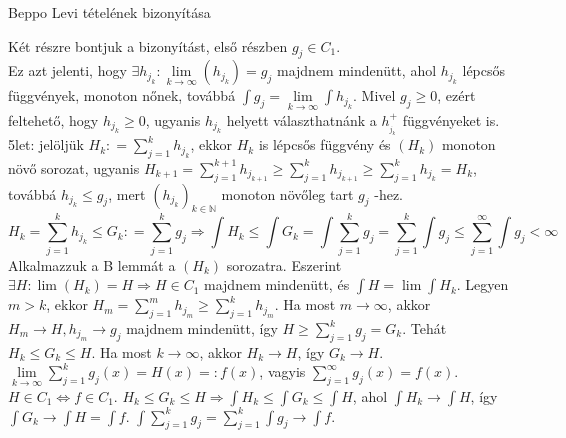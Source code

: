 \documentclass[12pt,a4paper]{scrartcl}
\newenvironment{bizonyitas}{}{}
\begin{document}
\begin{bizonyitas}

Beppo Levi tételének bizonyítása

Két részre bontjuk a bizonyítást, első részben \(g_{j} \in C_{1}\).\\
Ez azt jelenti, hogy
\(\exists h_{j_{k}}:\lim\limits_{k\rightarrow\infty}\left( h_{j_{k}} \right) = g_{j}\)
majdnem mindenütt, ahol \(h_{j_{k}}\) lépcsős függvények, monoton nőnek,
továbbá
\({\int{g_{j} =}}\lim\limits_{k\rightarrow\infty}{\int h_{j_{k}}}\).
Mivel \(g_{j} \geq 0\), ezért feltehető, hogy \(h_{j_{k}} \geq 0\),
ugyanis \(h_{j_{k}}\) helyett választhatnánk a \(h_{{}_{j_{k}}}^{+}\)
függvényeket is. 5let: jelöljük
\(H_{k}: = {\sum\limits_{j = 1}^{k}h_{j_{k}}}\), ekkor \(H_{k}\) is
lépcsős függvény és \(\left( H_{k} \right)\) monoton növő sorozat,
ugyanis
\(H_{k + 1} = {\sum\limits_{j = 1}^{k + 1}h_{j_{k + 1}}} \geq {\sum\limits_{j = 1}^{k}h_{j_{k + 1}}} \geq {\sum\limits_{j = 1}^{k}h_{j_{k}}} = H_{k}\),
továbbá \(h_{j_{k}} \leq g_{j}\), mert
\(\left( h_{j_{k}} \right)_{k \in {\mathbb{N}}}\) monoton növőleg tart
\(g_{j}\) -hez.
\[{H_k} = \sum\limits_{j = 1}^k {{h_{{j_k}}}}  \leqslant {G_k}: = \sum\limits_{j = 1}^k {{g_j}}  \Rightarrow \int {{H_k}}  \leqslant \int {{G_k}}  = \int {\sum\limits_{j = 1}^k {{g_j}} }  = \sum\limits_{j = 1}^k {\int {{g_j}} }  \leqslant \sum\limits_{j = 1}^\infty  {\int {{g_j}} }  < \infty \]
Alkalmazzuk a B lemmát a \(\left( H_{k} \right)\) sorozatra. Eszerint
\(\left. \exists H:\lim\left( H_{k} \right) = H\Rightarrow H \in C_{1} \right.\)
majdnem mindenütt, és \({\int H} = \lim{\int H_{k}}\). Legyen \(m > k\),
ekkor
\(H_{m} = {\sum\limits_{j = 1}^{m}h_{j_{m}}} \geq {\sum\limits_{j = 1}^{k}h_{j_{m}}}\).
Ha most \(\left. m\rightarrow\infty \right.\), akkor
\(\left. H_{m}\rightarrow H,h_{j_{m}}\rightarrow g_{j} \right.\) majdnem
mindenütt, így \(H \geq {\sum\limits_{j = 1}^{k}g_{j}} = G_{k}\). Tehát
\(H_{k} \leq G_{k} \leq H\). Ha most
\(\left. k\rightarrow\infty \right.\), akkor
\(\left. H_{k}\rightarrow H \right.\), így
\(\left. G_{k}\rightarrow H \right.\).
\(\lim\limits_{k\rightarrow\infty}{\sum\limits_{j = 1}^{k}{g_{j}\left( x \right)}} = H\left( x \right) = :f\left( x \right)\),
vagyis
\(\sum\limits_{j = 1}^{\infty}{g_{j}\left( x \right) = f\left( x \right)}\).
\(\left. H \in C_{1}\Leftrightarrow f \in C_{1} \right.\).
\(\left. H_{k} \leq G_{k} \leq H\Rightarrow{\int H_{k}} \leq {\int G_{k}} \leq {\int H} \right.\),
ahol \(\left. {\int H_{k}}\rightarrow{\int H} \right.\), így
\(\left. {\int G_{k}}\rightarrow{\int H} = {\int f} \right.\).
\(\int{{\sum\limits_{j = 1}^{k}g_{j}} = {\sum\limits_{j = 1}^{k}{\int\left. g_{j}\rightarrow{\int f} \right.}}}\).


\end{bizonyitas}
\end{document}
